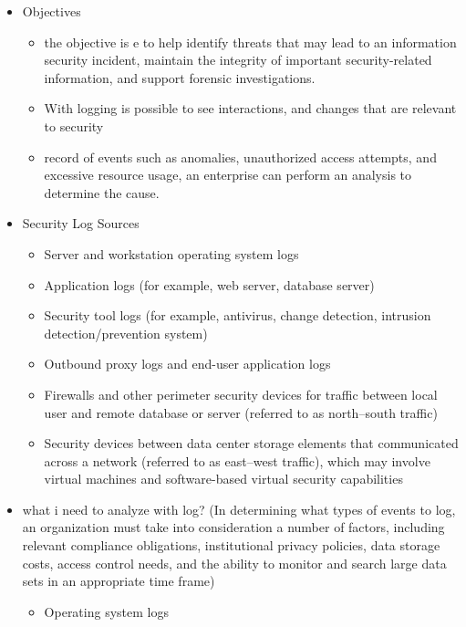\documentclass{article}
\begin{document}
\begin{itemize}
\begin{itemize}
\begin{figure}[h]
        \end{figure}
        \item Objectives
        \begin{itemize}
            \item the objective is e to help identify threats that may lead to an information security incident, maintain the integrity of important security-related information, and support forensic investigations.
            \item With logging is possible to see interactions, and changes that are relevant to security
            \item  record of events such as anomalies, unauthorized access attempts, and excessive resource usage, an enterprise can perform an analysis to determine the cause.
        \end{itemize}    
        \item Security Log Sources
        \begin{itemize}
            \item Server and workstation operating system logs
            \item Application logs (for example, web server, database server)
            \item Security tool logs (for example, antivirus, change detection, intrusion detection/prevention system)
            \item Outbound proxy logs and end-user application logs
            \item Firewalls and other perimeter security devices for traffic between local user and remote database or server (referred to as north–south traffic)
            \item Security devices between data center storage elements that communicated across a network (referred to as east–west traffic), which may involve virtual machines and software-based virtual security capabilities
        \end{itemize}
        \item what i need to analyze with log? (In determining what types of events to log, an organization must take into consideration a number of factors, including relevant compliance obligations, institutional privacy policies, data storage costs, access control needs, and the ability to monitor and search large data sets in an appropriate time frame)
        \begin{itemize}
            \item Operating system logs

\end{itemize}
\end{itemize}
\end{itemize}
\end{document}
